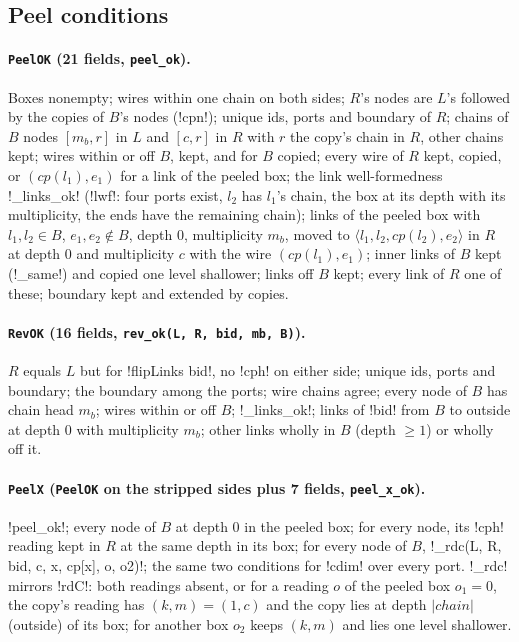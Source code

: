 {{{\subsection{Peel conditions}\label{sec:lean-export-peel-ok}

\paragraph{\texttt{PeelOK} (21 fields, \texttt{peel\_ok}).} Boxes nonempty; wires within one chain
on both sides; $R$'s nodes are $L$'s followed by the copies of $B$'s nodes (\lexpy!cpn!); unique ids,
ports and boundary of $R$; chains of $B$ nodes $[m_b, r]$ in $L$ and $[c, r]$ in $R$ with $r$ the
copy's chain in $R$, other chains kept; wires within or off $B$, kept, and for $B$ copied; every
wire of $R$ kept, copied, or $(\mathit{cp}(l_1), e_1)$ for a link of the peeled box; the link
well-formedness \lexpy!_links_ok! (\lexlean!lwf!: four ports exist, $l_2$ has $l_1$'s chain, the box at
its depth with its multiplicity, the ends have the remaining chain); links of the peeled box with
$l_1, l_2 \in B$, $e_1, e_2 \notin B$, depth 0, multiplicity $m_b$, moved to
$\langle l_1, l_2, \mathit{cp}(l_2), e_2\rangle$ in $R$ at depth 0 and multiplicity $c$ with the
wire $(\mathit{cp}(l_1), e_1)$; inner links of $B$ kept (\lexpy!_same!) and copied one level
shallower; links off $B$ kept; every link of $R$ one of these; boundary kept and extended by
copies.

\paragraph{\texttt{RevOK} (16 fields, \texttt{rev\_ok(L, R, bid, mb, B)}).} $R$ equals $L$ but for
\lexlean!flipLinks bid!, no \lexcode!cph! on either side; unique ids, ports and boundary; the boundary
among the ports; wire chains agree; every node of $B$ has chain head $m_b$; wires within or off
$B$; \lexpy!_links_ok!; links of \lexcode!bid! from $B$ to outside at depth 0 with multiplicity $m_b$;
other links wholly in $B$ (depth $\geq 1$) or wholly off it.

\paragraph{\texttt{PeelX} (\texttt{PeelOK} on the stripped sides plus 7 fields,
\texttt{peel\_x\_ok}).} \lexpy!peel_ok!; every node of $B$ at depth 0 in the peeled box; for every
node, its \lexcode!cph! reading kept in $R$ at the same depth in its box; for every node of $B$,
\lexpy!_rdc(L, R, bid, c, x, cp[x], o, o2)!; the same two conditions for \lexcode!cdim! over every port.
\lexpy!_rdc! mirrors \lexlean!rdC!: both readings absent, or for a reading $o$ of the peeled box
$o_1 = 0$, the copy's reading has $(k, m) = (1, c)$ and the copy lies at depth
$|\mathit{chain}|$ (outside) of its box; for another box $o_2$ keeps $(k, m)$ and lies one level
shallower.

}}}
